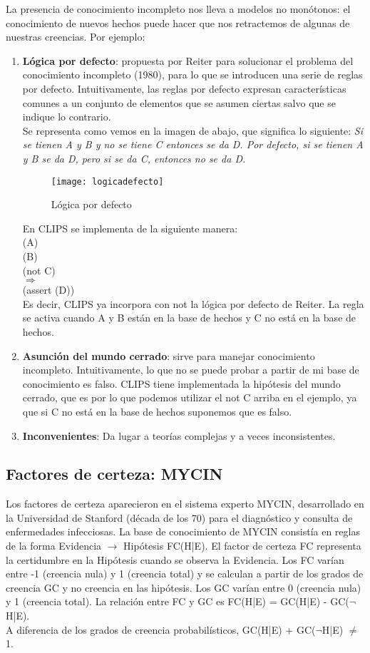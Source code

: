 \documentclass[12pt]{article}
\begin{document}
La presencia de conocimiento incompleto nos lleva a modelos no monótonos: el conocimiento de nuevos hechos puede hacer que nos retractemos de algunas de nuestras creencias. Por ejemplo:
\begin{enumerate}
\item \textbf{Lógica por defecto}: propuesta por Reiter para solucionar el problema del conocimiento incompleto (1980), para lo que se introducen una serie de reglas por defecto. Intuitivamente, las reglas por defecto expresan características comunes a un conjunto de elementos que se asumen ciertas salvo que se indique lo contrario.\\
Se representa como vemos en la imagen de abajo, que significa lo siguiente: \textit{Si se tienen A y B y no se tiene C entonces se da D. Por defecto, si se tienen A y B se da D, pero si se da C, entonces no se da D.}
\begin{figure}[H]
\texttt{[image: logicadefecto]}
\centering
\caption{Lógica por defecto}
\label{fig:logicadefecto}
\end{figure}

En CLIPS se implementa de la siguiente manera:\\
(A)\\
(B)\\
(not C)\\
$\Rightarrow$ \\
(assert (D))\\
Es decir, CLIPS ya incorpora con not la lógica por defecto de Reiter. La regla se activa cuando A y B están en la base de hechos y C no está en la base de hechos.

\item \textbf{Asunción del mundo cerrado}: sirve para manejar conocimiento incompleto.  Intuitivamente, lo que no se puede probar a partir de mi base de conocimiento es falso. CLIPS tiene implementada la hipótesis del mundo cerrado, que es por lo que podemos utilizar el not C arriba en el ejemplo, ya que si C no está en la base de hechos suponemos que es falso.
\item \textbf{Inconvenientes}: Da lugar a teorías complejas y a veces inconsistentes.
\end{enumerate}

\subsection{Factores de certeza: MYCIN}
Los factores de certeza aparecieron en el sistema experto MYCIN, desarrollado en la Universidad de Stanford (década de los 70) para el diagnóstico y consulta de enfermedades infecciosas. La base de conocimiento de MYCIN consistía en reglas de la forma Evidencia $\rightarrow$ Hipótesis FC(H|E). El factor de certeza FC representa la certidumbre en la Hipótesis cuando se observa la Evidencia. Los FC varían entre -1 (creencia nula) y 1 (creencia total) y se calculan a partir de los grados de creencia GC y no creencia en las hipótesis. Los GC varían entre 0 (creencia nula) y 1 (creencia total). La relación entre FC y GC es FC(H|E) = GC(H|E) - GC($\neg$H|E).\\
A diferencia de los grados de creencia probabilísticos, GC(H|E) + GC($\neg$H|E) $\neq$ 1. \\
\end{document}
